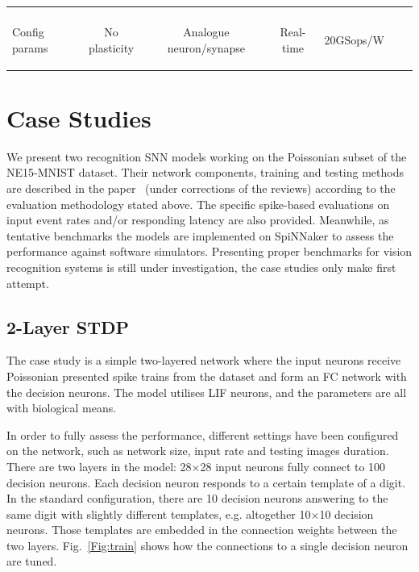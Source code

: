 \documentclass[journal]{journal}
\newenvironment{mycell}[1]
{
	\begin{minipage}{#1}
		\begin{center}
			\vspace*{0.15cm}
		}
		{
			\vspace*{0.1cm}
		\end{center}
	\end{minipage}
}
\begin{document}
\begin{table}[thb!]
\begin{center}
\begin{tabular}{l c c c c c c}
				\begin{mycell}{2.0cm}Fixed models,\\Config params\end{mycell}& 
				\begin{mycell}{2.0cm}No plasticity\end{mycell} &  
				\begin{mycell}{2.0cm}Analogue neuron/synapse\end{mycell} & 
				Real-time& 
				20GSops/W
			\end{tabular}
			\egroup
		\end{center}
		\label{tb:hardware_comparison}
	\end{table}

\section{Case Studies}
We present two recognition SNN models working on the Poissonian subset of the NE15-MNIST dataset.
Their network components, training and testing methods are described in the paper~\cite{Liu2015Bench} (under corrections of the reviews) according to the evaluation methodology stated above.
The specific spike-based evaluations on input event rates and/or responding latency are also provided. 
Meanwhile, as tentative benchmarks the models are implemented on SpiNNaker to assess the performance against software simulators.
Presenting proper benchmarks for vision recognition systems is still under investigation, the case studies only make first attempt.
	\subsection{2-Layer STDP}
	The case study is a simple two-layered network where the input neurons receive Poissonian presented spike trains from the dataset and form an FC network with the decision neurons.
	The model utilises LIF neurons, and the parameters are all with biological means.
	
	In order to fully assess the performance, different settings have been configured on the network, such as network size, input rate and testing images duration.
	There are two layers in the model: 28$\times$28 input neurons fully connect to 100 decision neurons.
	Each decision neuron responds to a certain template of a digit.
	In the standard configuration, there are 10 decision neurons answering to the same digit with slightly different templates, e.g. altogether 10$\times$10 decision neurons.
	Those templates are embedded in the connection weights between the two layers.
	Fig.~\ref{Fig:train} shows how the connections to a single decision neuron are tuned.
	
\end{document}
